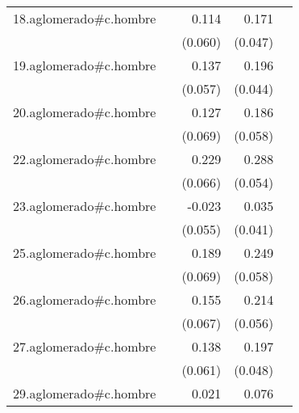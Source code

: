 {\begin{longtable}{l*{4}{D{.}{.}{-1}}}
\addlinespace
18.aglomerado#c.hombre&                     &       0.114         &       0.171\sym{***}&                     \\
            &                     &     (0.060)         &     (0.047)         &                     \\
\addlinespace
19.aglomerado#c.hombre&                     &       0.137\sym{*}  &       0.196\sym{***}&                     \\
            &                     &     (0.057)         &     (0.044)         &                     \\
\addlinespace
20.aglomerado#c.hombre&                     &       0.127         &       0.186\sym{**} &                     \\
            &                     &     (0.069)         &     (0.058)         &                     \\
\addlinespace
22.aglomerado#c.hombre&                     &       0.229\sym{***}&       0.288\sym{***}&                     \\
            &                     &     (0.066)         &     (0.054)         &                     \\
\addlinespace
23.aglomerado#c.hombre&                     &      -0.023         &       0.035         &                     \\
            &                     &     (0.055)         &     (0.041)         &                     \\
\addlinespace
25.aglomerado#c.hombre&                     &       0.189\sym{**} &       0.249\sym{***}&                     \\
            &                     &     (0.069)         &     (0.058)         &                     \\
\addlinespace
26.aglomerado#c.hombre&                     &       0.155\sym{*}  &       0.214\sym{***}&                     \\
            &                     &     (0.067)         &     (0.056)         &                     \\
\addlinespace
27.aglomerado#c.hombre&                     &       0.138\sym{*}  &       0.197\sym{***}&                     \\
            &                     &     (0.061)         &     (0.048)         &                     \\
\addlinespace
29.aglomerado#c.hombre&                     &       0.021         &       0.076\sym{*}  &                     \\

\end{longtable}}
